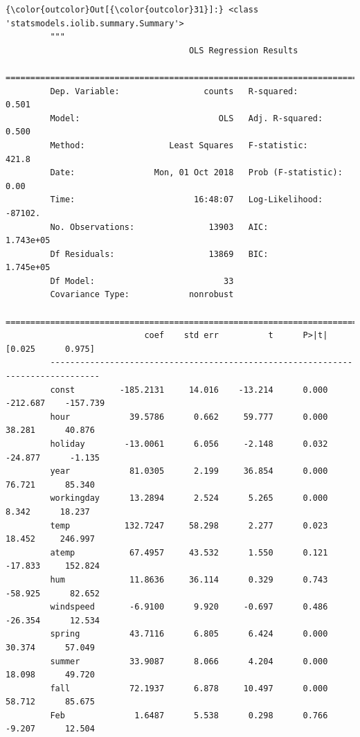 \documentclass[11pt]{article}
\begin{document}
\begin{Verbatim}[commandchars=\\\{\}]
{\color{outcolor}Out[{\color{outcolor}31}]:} <class 'statsmodels.iolib.summary.Summary'>
         """
                                     OLS Regression Results                            
         ==============================================================================
         Dep. Variable:                 counts   R-squared:                       0.501
         Model:                            OLS   Adj. R-squared:                  0.500
         Method:                 Least Squares   F-statistic:                     421.8
         Date:                Mon, 01 Oct 2018   Prob (F-statistic):               0.00
         Time:                        16:48:07   Log-Likelihood:                -87102.
         No. Observations:               13903   AIC:                         1.743e+05
         Df Residuals:                   13869   BIC:                         1.745e+05
         Df Model:                          33                                         
         Covariance Type:            nonrobust                                         
         ================================================================================
                            coef    std err          t      P>|t|      [0.025      0.975]
         --------------------------------------------------------------------------------
         const         -185.2131     14.016    -13.214      0.000    -212.687    -157.739
         hour            39.5786      0.662     59.777      0.000      38.281      40.876
         holiday        -13.0061      6.056     -2.148      0.032     -24.877      -1.135
         year            81.0305      2.199     36.854      0.000      76.721      85.340
         workingday      13.2894      2.524      5.265      0.000       8.342      18.237
         temp           132.7247     58.298      2.277      0.023      18.452     246.997
         atemp           67.4957     43.532      1.550      0.121     -17.833     152.824
         hum             11.8636     36.114      0.329      0.743     -58.925      82.652
         windspeed       -6.9100      9.920     -0.697      0.486     -26.354      12.534
         spring          43.7116      6.805      6.424      0.000      30.374      57.049
         summer          33.9087      8.066      4.204      0.000      18.098      49.720
         fall            72.1937      6.878     10.497      0.000      58.712      85.675
         Feb              1.6487      5.538      0.298      0.766      -9.207      12.504

\end{Verbatim}
\end{document}
